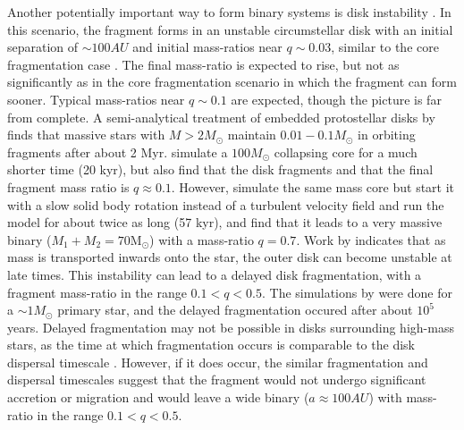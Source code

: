 Another potentially important way to form binary systems is disk instability
\citep[see e.g.][]{Kratter2006, Stamatellos2011}. In
this scenario, the fragment forms in an unstable circumstellar disk
with an initial separation of $\sim 100 AU$ and initial mass-ratios
near $q \sim 0.03$, similar to the core fragmentation case
\citep{Kratter2006}. The final mass-ratio is expected to rise, but not
as significantly as in the core fragmentation scenario in which the
fragment can form sooner. Typical mass-ratios near $q \sim 0.1$ are expected, though the picture is far from complete. 
A semi-analytical treatment of embedded protostellar disks by
\cite{Kratter2008} finds that massive stars with $M > 2M_{\odot}$ maintain $0.01 - 0.1
M_{\odot}$ in orbiting fragments after about 2 Myr. \cite{Krumholz2007}
simulate a $100 M_{\odot}$ collapsing core for a much shorter time (20 kyr),
but also find that the disk fragments and that the final fragment mass
ratio is $q \approx 0.1$. However, \cite{Krumholz2009} simulate the same mass core
but start it with a slow solid body rotation instead of a turbulent velocity field and run the model for about twice as long (57 kyr), and find that it leads to a very massive binary ($M_1 + M_2 = 70 \mathrm{M}_{\odot}$) with 
a mass-ratio $q = 0.7$. Work by \cite{Clarke2009} indicates that as
mass is transported inwards onto the star, the outer disk can become unstable at late times. This
instability can lead to a delayed disk fragmentation,
with a fragment mass-ratio in the range $0.1 < q <
0.5$. The simulations by \cite{Clarke2009} were done for a $\sim
1M_{\odot}$ primary star, and the delayed fragmentation occured after
about $10^5$ years. Delayed fragmentation may not be possible in disks surrounding
high-mass stars, as the time at which fragmentation occurs is
comparable to the disk dispersal timescale \citep{Klahr2006}. However,
if it does occur, the similar fragmentation and dispersal timescales suggest that the fragment
would not undergo significant accretion or migration and would leave a
wide binary ($a \approx 100 AU$) with mass-ratio in the range $0.1 < q <
0.5$.


